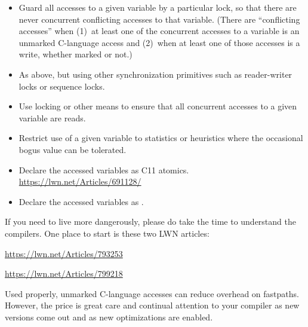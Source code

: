 \begin{itemize}
 \item	Guard all accesses to a given variable by a particular lock,
	so that there are never concurrent conflicting accesses to
	that variable.
	(There are ``conflicting accesses'' when
	(1)~at least one of the concurrent accesses to a variable is an
	unmarked C-language access and (2)~when at least one of those
	accesses is a write, whether marked or not.)

 \item	As above, but using other synchronization primitives such
	as reader-writer locks or sequence locks.

 \item	Use locking or other means to ensure that all concurrent accesses
	to a given variable are reads.

 \item	Restrict use of a given variable to statistics or heuristics
	where the occasional bogus value can be tolerated.

 \item	Declare the accessed variables as C11 atomics.
	\url{https://lwn.net/Articles/691128/}

 \item	Declare the accessed variables as .
\end{itemize}

If you need to live more dangerously, please do take the time to
understand the compilers.
One place to start is these two LWN articles:

\begin{description}[style=nextline]
\item[Who's afraid of a big bad optimizing compiler?]
	\url{https://lwn.net/Articles/793253}
\item[Calibrating your fear of big bad optimizing compilers]
	\url{https://lwn.net/Articles/799218}
\end{description}  

Used properly, unmarked C-language accesses can reduce overhead on
fastpaths.
However, the price is great care and continual attention to your compiler
as new versions come out and as new optimizations are enabled.
